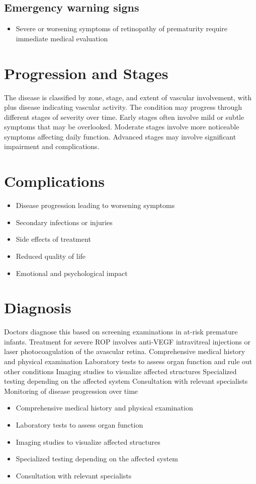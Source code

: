 \subsection{Emergency warning signs}
\begin{itemize}[noitemsep]
  \item Severe or worsening symptoms of retinopathy of prematurity require immediate medical evaluation
\end{itemize}
\section{Progression and Stages}
The disease is classified by zone, stage, and extent of vascular involvement, with plus disease indicating vascular activity. The condition may progress through different stages of severity over time. Early stages often involve mild or subtle symptoms that may be overlooked. Moderate stages involve more noticeable symptoms affecting daily function. Advanced stages may involve significant impairment and complications.
\section{Complications}
\begin{itemize}[noitemsep]
  \item Disease progression leading to worsening symptoms
  \item Secondary infections or injuries
  \item Side effects of treatment
  \item Reduced quality of life
  \item Emotional and psychological impact
\end{itemize}
\section{Diagnosis}
Doctors diagnose this based on screening examinations in at-risk premature infants. Treatment for severe ROP involves anti-VEGF intravitreal injections or laser photocoagulation of the avascular retina. Comprehensive medical history and physical examination Laboratory tests to assess organ function and rule out other conditions Imaging studies to visualize affected structures Specialized testing depending on the affected system Consultation with relevant specialists Monitoring of disease progression over time

\begin{itemize}[noitemsep]
  \item Comprehensive medical history and physical examination
  \item Laboratory tests to assess organ function
  \item Imaging studies to visualize affected structures
  \item Specialized testing depending on the affected system
  \item Consultation with relevant specialists
\end{itemize}
